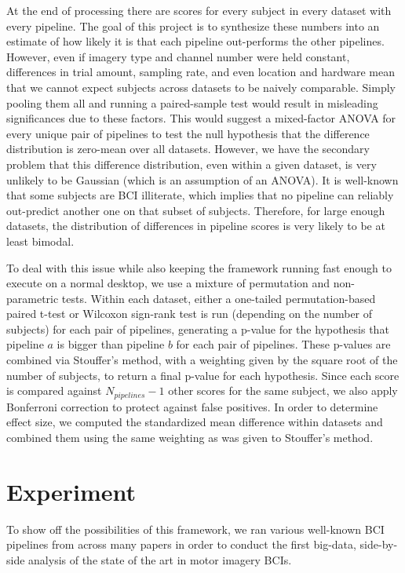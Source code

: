 At the end of processing there are scores for every subject in every dataset
with every pipeline. The goal of this project is to synthesize these numbers
into an estimate of how likely it is that each pipeline out-performs the other
pipelines. However, even if imagery type and channel number were held constant,
differences in trial amount, sampling rate, and even location and hardware mean
that we cannot expect subjects across datasets to be naively comparable. Simply
pooling them all and running a paired-sample test would result in misleading
significances due to these factors. This would suggest a mixed-factor ANOVA for
every unique pair of pipelines to test the null hypothesis that the difference
distribution is zero-mean over all datasets. However, we have the secondary
problem that this difference distribution, even within a given dataset, is very
unlikely to be Gaussian (which is an assumption of an ANOVA). It is well-known
that some subjects are BCI illiterate\cite{Allison2010}, which implies that no
pipeline can reliably out-predict another one on that subset of
subjects. Therefore, for large enough datasets, the distribution of differences
in pipeline scores is very likely to be at least bimodal.

To deal with this issue while also keeping the framework running fast enough to
execute on a normal desktop, we use a mixture of permutation and non-parametric
tests. Within each dataset, either a one-tailed permutation-based paired t-test
or Wilcoxon sign-rank test is run (depending on the number of subjects) for each
pair of pipelines, generating a p-value for the hypothesis that pipeline $a$ is
bigger than pipeline $b$ for each pair of pipelines. These p-values are combined
via Stouffer's method, with a weighting given by the square root of the number
of subjects, to return a final p-value for each hypothesis. Since each score is
compared against $N_{pipelines}-1$ other scores for the same subject, we also
apply Bonferroni correction to protect against false positives. In order to
determine effect size, we computed the standardized mean difference within
datasets and combined them using the same weighting as was given to Stouffer's
method. 

\section{Experiment}

To show off the possibilities of this framework, we ran various well-known BCI
pipelines from across many papers in order to conduct the first big-data,
side-by-side analysis of the state of the art in motor imagery BCIs.


